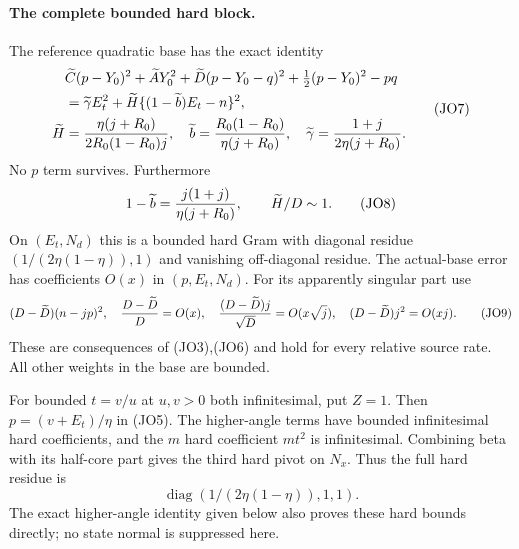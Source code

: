 \paragraph{The complete bounded hard block.}
The reference quadratic base has the exact identity
\[
 \begin{aligned}
 &\widetilde C(p-Y_0)^2+\widetilde A Y_0^2+
 \widetilde D(p-Y_0-q)^2+\tfrac12(p-Y_0)^2-pq\\
 &=\widetilde\gamma E_t^2+
 \widetilde H\{(1-\widetilde b)E_t-n\}^2,               \\
 \widetilde H&={\eta(j+R_0)\over2R_0(1-R_0)j},\quad
 \widetilde b={R_0(1-R_0)\over\eta(j+R_0)},\quad
 \widetilde\gamma={1+j\over2\eta(j+R_0)} .
 \end{aligned} \tag{JO7}
\]
No $p$ term survives. Furthermore
\[
 1-\widetilde b={j(1+j)\over\eta(j+R_0)},\qquad
 \widetilde H/D\sim1.                                 \tag{JO8}
\]
On $(E_t,N_d)$ this is a bounded hard Gram with diagonal residue
$(1/(2\eta(1-\eta)),1)$ and vanishing off-diagonal residue.
The actual-base error has coefficients $O(x)$ in $(p,E_t,N_d)$.
For its apparently singular part use
\[
 (D-\widetilde D)(n-jp)^2,\quad
 {D-\widetilde D\over D}=O(x),\quad
 {(D-\widetilde D)j\over\sqrt D}=O(x\sqrt j),\quad
 (D-\widetilde D)j^2=O(xj).                           \tag{JO9}
\]
These are consequences of (JO3),(JO6) and hold for every relative
source rate. All other weights in the base are bounded.

For bounded $t=v/u$ at $u,v>0$ both infinitesimal, put $Z=1$.
Then $p=(v+E_t)/\eta$ in (JO5). The higher-angle terms have
bounded infinitesimal hard coefficients, and the $m$ hard coefficient
$m t^2$ is infinitesimal. Combining beta with its half-core part gives
the third hard pivot on $N_x$. Thus the full hard residue is
\[
                 \operatorname{diag}(1/(2\eta(1-\eta)),1,1).
                                                               \tag{JO10}
\]
The exact higher-angle identity given below also proves these hard
bounds directly; no state normal is suppressed here.

